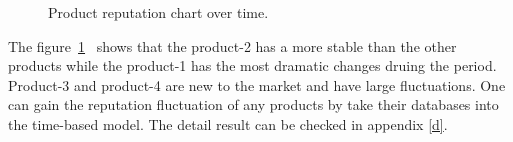 \documentclass[12pt]{article}%
\begin{document}
\begin{figure}[H]
	\centering
	
	\centering
	\caption{Product reputation chart over time.}\label{repu}	
\end{figure}
The figure~\ref{repu}~ shows that the product-2 has a more stable than the other products while the product-1 has the most dramatic changes druing the period. Product-3 and product-4 are new to the market and have large fluctuations. One can gain the reputation fluctuation of any products by take their databases into the time-based model.
The detail result can be checked in appendix \ref{d}.
\end{document}
